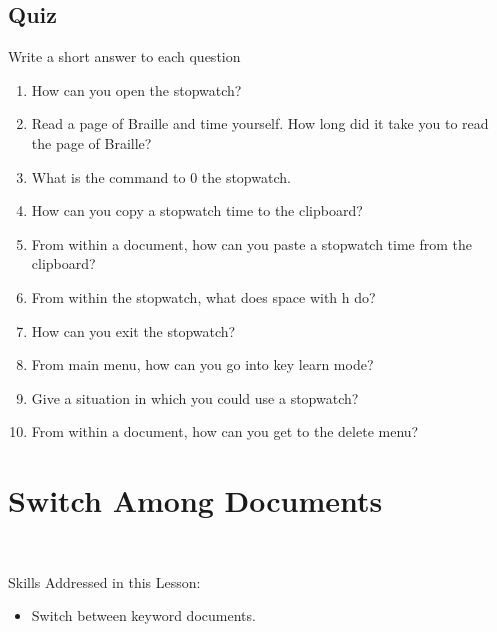 \documentclass[10pt,letterpaper,twoside]{report}
\begin{document}
{{{\clearpage

\subsection{Quiz}
Write a short answer to each question


\begin{enumerate}
	\item How can you open the stopwatch?
	\item Read a page of Braille and time yourself.  How long did it take you to read the page of Braille?
	\item What is the command to 0 the stopwatch.
	\item How can you copy a stopwatch time to the clipboard?
	\item From within a document, how can you paste a stopwatch time from the clipboard?
	\item From within the stopwatch, what does space with h do?
	\item How can you exit the stopwatch?
	\item From main menu, how can you go into key learn mode?
	\item Give a situation in which you could use a stopwatch?
	\item From within a document, how can you get to the delete menu?
\end{enumerate}

\clearpage

\section{ Switch Among Documents}
\

Skills Addressed in this Lesson:
\begin{itemize}
	\item Switch between keyword documents.
\end{itemize}



}}}
\end{document}
